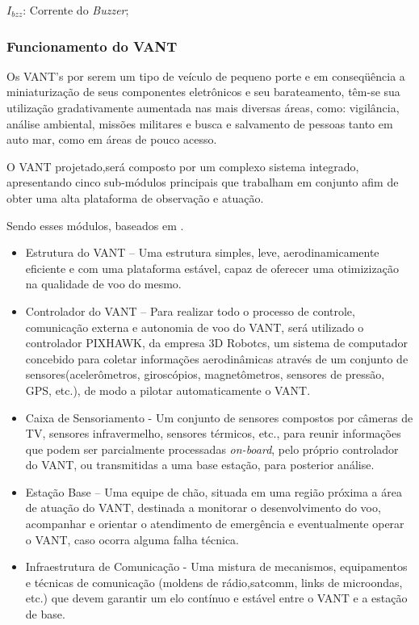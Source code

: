 \indent $I_{bzz}$: Corrente do \textit{Buzzer}; 

	

\subsubsection{Funcionamento do VANT}

Os VANT's por serem um tipo de veículo de pequeno porte e em conseqüência a miniaturização de seus componentes eletrônicos e seu barateamento, têm-se sua utilização gradativamente aumentada nas mais diversas áreas, como: vigilância, análise ambiental, missões militares e busca e salvamento de pessoas tanto em auto mar, como em áreas de pouco acesso. \cite{Branco}

O VANT projetado,será composto por um complexo sistema integrado, apresentando cinco sub-módulos principais  que trabalham em conjunto afim de obter uma alta plataforma de observação e atuação.

Sendo esses módulos, baseados em .

\begin{itemize}
	\item Estrutura do VANT – Uma estrutura simples, leve, aerodinamicamente eficiente e com uma plataforma estável, capaz de oferecer uma otimizização na qualidade de voo do mesmo. 
	\item Controlador do VANT – Para realizar todo o processo de controle, comunicação externa e autonomia de voo do VANT, será utilizado o controlador PIXHAWK, da empresa 3D Robotcs, um sistema de computador concebido para coletar informações aerodinâmicas através de um conjunto de sensores(acelerômetros, giroscópios, magnetômetros, sensores de pressão, GPS, etc.), de modo a pilotar automaticamente o VANT.
	\item Caixa de Sensoriamento - Um conjunto de sensores compostos por câmeras de TV, sensores infravermelho, sensores térmicos, etc., para reunir informações que podem ser parcialmente processadas \textit{on-board}, pelo próprio controlador do VANT, ou transmitidas a uma base estação, para posterior análise.
	\item Estação Base – Uma equipe de chão, situada em uma região próxima a área de atuação do VANT, destinada a monitorar o desenvolvimento do voo, acompanhar e orientar o atendimento de emergência e eventualmente operar o VANT, caso ocorra alguma falha técnica. 
	\item Infraestrutura de Comunicação - Uma mistura de mecanismos, equipamentos e técnicas de comunicação (moldens de rádio,satcomm, links de microondas, etc.) que devem garantir um elo contínuo e estável entre o VANT e a estação de base. 
\end{itemize}


